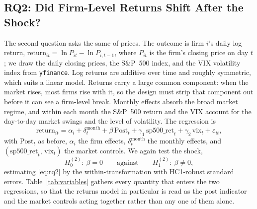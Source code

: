 \documentclass[conference]{IEEEtran}
\begin{document}
\subsection{RQ2: Did Firm-Level Returns Shift After the Shock?}
The second question asks the same of prices. The outcome is firm $i$'s daily log
return, $\text{return}_{it} = \ln P_{it} - \ln P_{i,t-1}$, where $P_{it}$ is the
firm's closing price on day $t$; we draw the daily closing prices, the S\&P~500 index,
and the VIX volatility index from \texttt{yfinance}. Log returns are additive over
time and roughly symmetric, which suits a linear model. Returns carry a large common
component: when the market rises, most firms rise with it, so the design must strip
that component out before it can see a firm-level break. Monthly effects absorb the
broad market regime, and within each month the S\&P~500 return and the VIX account for
the day-to-day market swings and the level of volatility. The regression is
\begin{equation}
\text{return}_{it} = \alpha_i + \delta_t^{\text{month}} + \beta\,\text{Post}_t
+ \gamma_1\,\text{sp500\_ret}_t + \gamma_2\,\text{vix}_t + \varepsilon_{it},
\label{eq:rq2}
\end{equation}
with $\text{Post}_t$ as before, $\alpha_i$ the firm effects, $\delta_t^{\text{month}}$
the monthly effects, and $(\text{sp500\_ret}_t,\,\text{vix}_t)$ the market controls. We
again test the shock,
\begin{equation*}
H_0^{(2)}:\ \beta = 0 \qquad\text{against}\qquad H_1^{(2)}:\ \beta \neq 0,
\end{equation*}
estimating \eqref{eq:rq2} by the within-transformation with HC1-robust standard errors.
Table~\ref{tab:variables} gathers every quantity that enters the two regressions, so
that the returns model in particular is read as the post indicator and the market
controls acting together rather than any one of them alone.
\end{document}
